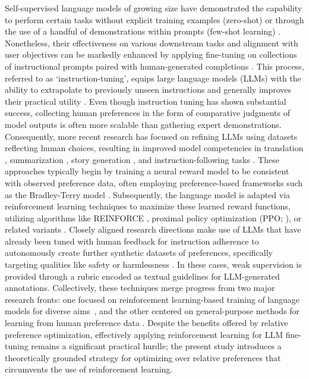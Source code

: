 Self-supervised language models of growing size have demonstrated the capability to perform certain tasks without explicit training examples (zero-shot) \citep{radford2019language} or through the use of a handful of demonstrations within prompts (few-shot learning) \citep{gpt3,megatron,chowdhery2022palm}. Nonetheless, their effectiveness on various downstream tasks and alignment with user objectives can be markedly enhanced by applying fine-tuning on collections of instructional prompts paired with human-generated completions \citep{mishra-etal-2022-cross,sanh2022multitask,chung2022scaling,thoppilan2022lamda}. This process, referred to as ‘instruction-tuning’, equips large language models (LLMs) with the ability to extrapolate to previously unseen instructions and generally improves their practical utility \citep{chung2022scaling}. Even though instruction tuning has shown substantial success, collecting human preferences in the form of comparative judgments of model outputs is often more scalable than gathering expert demonstrations. Consequently, more recent research has focused on refining LLMs using datasets reflecting human choices, resulting in improved model competencies in translation \citep{kreutzer-etal-2018-reliability}, summarization \citep{stiennon2022learning,ziegler2020finetuning}, story generation \citep{ziegler2020finetuning}, and instruction-following tasks \citep{ouyang2022training,ramamurthy2023is}. These approaches typically begin by training a neural reward model to be consistent with observed preference data, often employing preference-based frameworks such as the Bradley-Terry model \citep{bradley1952rankanalysis}. Subsequently, the language model is adapted via reinforcement learning techniques to maximize these learned reward functions, utilizing algorithms like REINFORCE \citep{williams1992reinforce}, proximal policy optimization (PPO; \cite{schulman2017proximal}), or related variants \citep{ramamurthy2023is}. Closely aligned research directions make use of LLMs that have already been tuned with human feedback for instruction adherence to autonomously create further synthetic datasets of preferences, specifically targeting qualities like safety or harmlessness \citep{bai2022constitutional}. In these cases, weak supervision is provided through a rubric encoded as textual guidelines for LLM-generated annotations. Collectively, these techniques merge progress from two major research fronts: one focused on reinforcement learning-based training of language models for diverse aims~\citep{Ranzato2015SequenceLT,paulus2018a,wu2018learning}, and the other centered on general-purpose methods for learning from human preference data \citep{christiano2017deep,kupcsik2018learning}. Despite the benefits offered by relative preference optimization, effectively applying reinforcement learning for LLM fine-tuning remains a significant practical hurdle; the present study introduces a theoretically grounded strategy for optimizing over relative preferences that circumvents the use of reinforcement learning.

